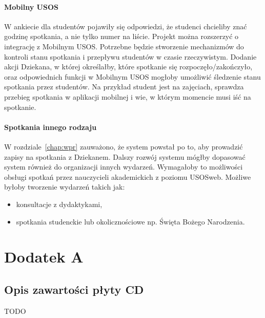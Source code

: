 \documentclass[licencjacka]{pracamgr}
\begin{document}
\subsubsection{Mobilny USOS}

W ankiecie dla studentów pojawiły się odpowiedzi, że studenci chcieliby znać godzinę spotkania, a nie tylko numer na liście. Projekt można rozszerzyć o integrację z Mobilnym USOS. Potrzebne będzie stworzenie mechanizmów do kontroli stanu spotkania i przepływu studentów w czasie rzeczywistym. Dodanie akcji Dziekana, w której określałby, które spotkanie się rozpoczęło/zakończyło, oraz odpowiednich funkcji w Mobilnym USOS mogłoby umożliwić śledzenie stanu spotkania przez studentów. Na przykład student jest na zajęciach, sprawdza przebieg spotkania w aplikacji mobilnej i wie, w którym momencie musi iść na spotkanie.

\subsubsection{Spotkania innego rodzaju}
W rozdziale~\ref{chap:wpr} zauważono, że system powstał po to, aby prowadzić zapisy na spotkania z Dziekanem. Dalszy rozwój systemu mógłby dopasować system również do organizacji innych wydarzeń. Wymagałoby to możliwości obsługi spotkań przez nauczycieli akademickich z poziomu USOSweb. Możliwe byłoby tworzenie wydarzeń takich jak:
\begin{itemize}
	\item konsultacje z dydaktykami,
	\item spotkania studenckie lub okolicznościowe np. Święta Bożego Narodzenia.
\end{itemize}

\chapter*{Dodatek A} \label{chap:dodatki}
\section*{Opis zawartości płyty CD}
TODO
\end{document}
